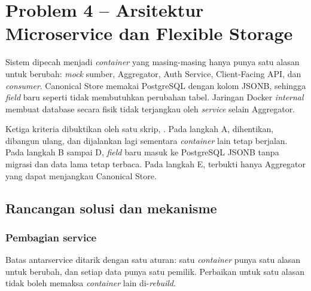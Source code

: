 \chapter{Problem 4 -- Arsitektur Microservice dan Flexible Storage}

\begin{ringkas}
Sistem dipecah menjadi \emph{container} yang masing-masing hanya punya satu alasan untuk berubah: \emph{mock} sumber, Aggregator,
Auth Service, Client-Facing API, dan \emph{consumer}. Canonical Store memakai PostgreSQL dengan kolom JSONB, sehingga
\emph{field} baru seperti  tidak membutuhkan perubahan tabel. Jaringan Docker \emph{internal} membuat
database secara fisik tidak terjangkau oleh \emph{service} selain Aggregator.
\end{ringkas}

\begin{catatan}
Ketiga kriteria dibuktikan oleh satu skrip, . Pada langkah A,  dihentikan, dibangun
ulang, dan dijalankan lagi sementara \emph{container} lain tetap berjalan. Pada langkah B sampai D, \emph{field} baru masuk ke
PostgreSQL JSONB tanpa migrasi dan data lama tetap terbaca. Pada langkah E, terbukti hanya Aggregator yang dapat
menjangkau Canonical Store.
\end{catatan}

\section{Rancangan solusi dan mekanisme}

\subsection{Pembagian service}

Batas antarservice ditarik dengan satu aturan: satu \emph{container} punya satu alasan untuk berubah, dan setiap data
punya satu pemilik. Perbaikan untuk satu alasan tidak boleh memaksa \emph{container} lain di-\emph{rebuild}.

